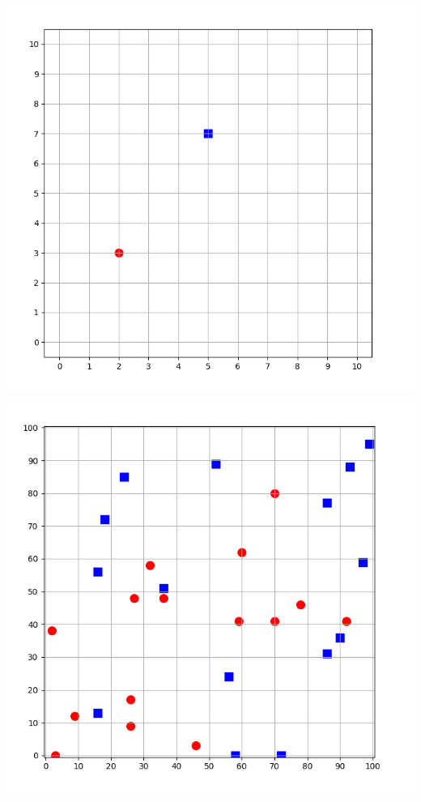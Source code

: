 \documentclass[10pt,class=report,crop=false]{standalone}
\begin{document}
\begin{activite}
\begin{enumerate}
\begin{enumerate}
		\begin{center}
			\includegraphics[scale=\myscale,scale=0.25]{ecran-voisins-1} \quad
			\includegraphics[scale=\myscale,scale=0.25]{ecran-voisins-2}
		\end{center}
		

\end{enumerate}
\end{enumerate}
\end{activite}
\end{document}
